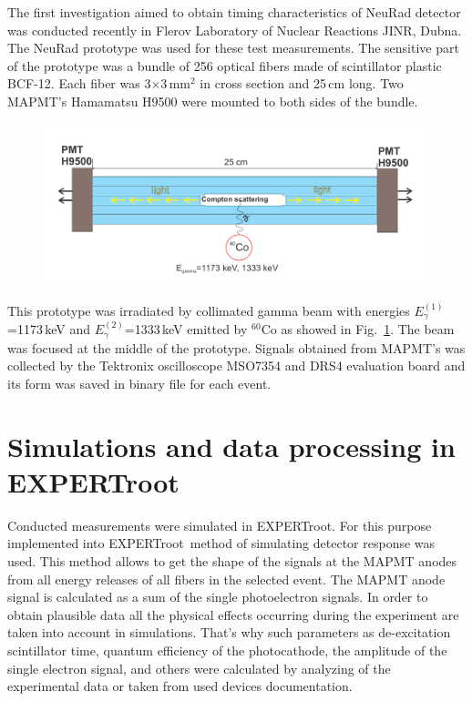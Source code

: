 \documentclass{webofc}
\newcommand{\er}{\textmd{EXPERTroot}}
\begin{document}
The first investigation aimed to obtain timing characteristics of NeuRad detector was conducted recently in Flerov Laboratory of Nuclear Reactions JINR, Dubna. The NeuRad prototype was used for these test measurements. The sensitive part of the prototype was a bundle of 256 optical fibers made of scintillator plastic BCF-12. Each fiber was  3$\times$3\,mm$^2$ in cross section and 25\,cm long.
Two MAPMT's Hamamatsu H9500 were mounted to both sides of the bundle.


\begin{figure}[h]
	\centering
	\includegraphics[width=1\linewidth]{NeuRadexperiment.png}
	\label{ris:neuradexp}
\end{figure}

This prototype was irradiated by collimated gamma beam with energies $E^{(1)}_{\gamma}$=1173\,keV and $E^{(2)}_{\gamma}$=1333\,keV emitted by $^{60}$Co as showed in Fig.~\ref{ris:neuradexp}. The beam was focused at the middle of the prototype. Signals obtained from MAPMT's was collected by the Tektronix oscilloscope MSO7354 and DRS4 evaluation board and its form was saved in binary file for each event.

\section{Simulations and data processing in EXPERTroot}
Conducted measurements were simulated in \er. For this purpose implemented into \er\, method of simulating detector response was used.
This method allows to get the shape of the signals at the MAPMT anodes from all energy releases of all fibers in the selected event. The MAPMT anode signal is calculated as a sum of the single photoelectron signals. 
In order to obtain plausible data all the physical effects occurring during the experiment are taken into account in simulations.
That's why such parameters as de-excitation scintillator time, quantum efficiency of the photocathode, the amplitude of the single electron signal, and others were calculated by analyzing of the experimental data or taken from used devices documentation.
\end{document}
